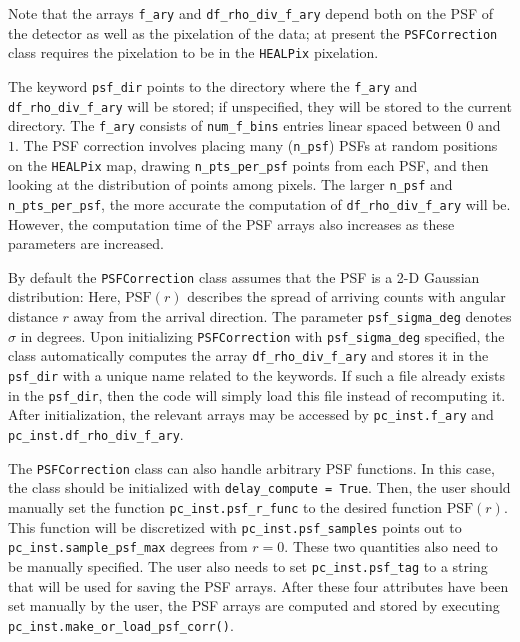 Note that the arrays  \lstinline{f_ary} and \lstinline{df_rho_div_f_ary} depend both on the PSF of the detector as well as the pixelation of the data; at present the \lstinline{PSFCorrection} class requires the pixelation to be in the \texttt{HEALPix} pixelation.

The keyword \lstinline{psf_dir} points to the directory where the \lstinline{f_ary} and \lstinline{df_rho_div_f_ary} will be stored; if unspecified, they will be stored to the current directory.  The \lstinline{f_ary} consists of \lstinline{num_f_bins} entries linear spaced between $0$ and $1$.  The PSF correction involves placing many \mbox{(\lstinline{n_psf})} PSFs at random positions on the \texttt{HEALPix} map, drawing \lstinline{n_pts_per_psf} points from each PSF, and then looking at the distribution of points among pixels.  The larger \lstinline{n_psf} and \lstinline{n_pts_per_psf}, the more accurate the computation of \lstinline{df_rho_div_f_ary} will be.  However, the computation time of the PSF arrays also increases as these parameters are increased.  

By default the \lstinline{PSFCorrection} class assumes that the PSF is a 2-D Gaussian distribution:
Here, $\text{PSF}(r)$ describes the spread of arriving counts with angular distance $r$ away from the arrival direction.  The parameter \lstinline{psf_sigma_deg} denotes $\sigma$ in degrees.  Upon initializing \lstinline{PSFCorrection} with \lstinline{psf_sigma_deg} specified, the class automatically computes the array \lstinline{df_rho_div_f_ary} and stores it in the \lstinline{psf_dir} with a unique name related to the keywords.  If such a file already exists in the \lstinline{psf_dir}, then the code will simply load this file instead of recomputing it.  After initialization, the relevant arrays may be accessed by \lstinline{pc_inst.f_ary} and  \lstinline{pc_inst.df_rho_div_f_ary}. 

The \lstinline{PSFCorrection} class can also handle arbitrary PSF functions.  In this case, the class should be initialized with \lstinline{delay_compute = True}.  Then, the user should manually set the function \lstinline{pc_inst.psf_r_func} to the desired function $\text{PSF}(r)$.  This function will be discretized with \lstinline{pc_inst.psf_samples} points out to \lstinline{pc_inst.sample_psf_max} degrees from $r=0$.  These two quantities also need to be manually specified.  The user also needs to set \lstinline{pc_inst.psf_tag} to a string that will be used for saving the PSF arrays.  After these four attributes have been set manually by the user, the PSF arrays are computed and stored by executing \mbox{\lstinline{pc_inst.make_or_load_psf_corr()}}.

